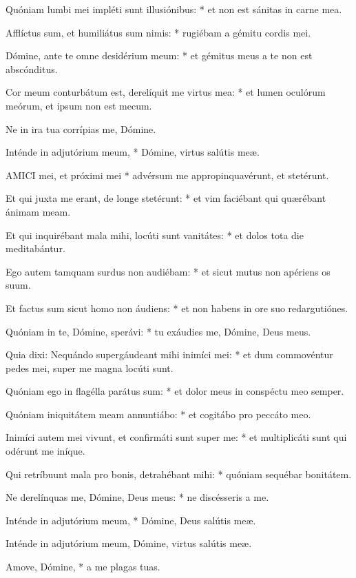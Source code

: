 Quóniam lumbi mei impléti sunt illusiónibus: * et non est sánitas in carne mea.

Afflíctus sum, et humiliátus sum nimis: * rugiébam a gémitu cordis mei.

Dómine, ante te omne desidérium meum: * et gémitus meus a te non est abscónditus.

Cor meum conturbátum est, derelíquit me virtus mea: * et lumen oculórum meórum, et ipsum non est mecum.

 Ne in ira tua corrípias me, Dómine.

 Inténde in adjutórium meum, * Dómine, virtus salútis meæ.


\lettrine[lines=2]{A}{MICI} mei, et próximi mei * advérsum me appropinquavérunt, et stetérunt.

Et qui juxta me erant, de longe stetérunt: * et vim faciébant qui quærébant ánimam meam.

Et qui inquirébant mala mihi, locúti sunt vanitátes: * et dolos tota die meditabántur.

Ego autem tamquam surdus non audiébam: * et sicut mutus non apériens os suum.

Et factus sum sicut homo non áudiens: * et non habens in ore suo redargutiónes.

Quóniam in te, Dómine, sperávi: * tu exáudies me, Dómine, Deus meus.

Quia dixi: Nequándo supergáudeant mihi inimíci mei: * et dum commovéntur pedes mei, super me magna locúti sunt.

Quóniam ego in flagélla parátus sum: * et dolor meus in conspéctu meo semper.

Quóniam iniquitátem meam annuntiábo: * et cogitábo pro peccáto meo.

Inimíci autem mei vivunt, et confirmáti sunt super me: * et multiplicáti sunt qui odérunt me iníque.

Qui retríbuunt mala pro bonis, detrahébant mihi: * quóniam sequébar bonitátem.

Ne derelínquas me, Dómine, Deus meus: * ne discésseris a me.

Inténde in adjutórium meum, * Dómine, Deus salútis meæ.

 Inténde in adjutórium meum, Dómine, virtus salútis meæ.

 Amove, Dómine, * a me plagas tuas.


